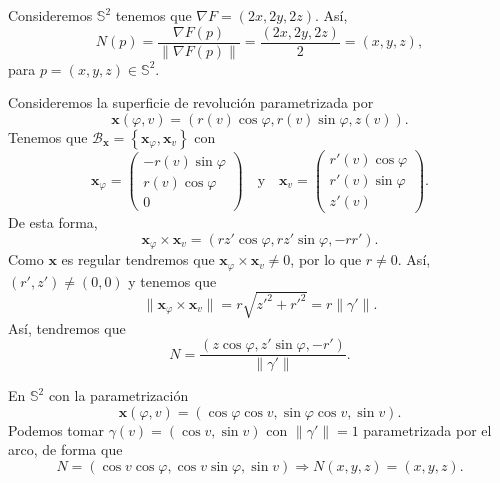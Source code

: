 \begin{eg}
Consideremos $\displaystyle \mathbb{S}^{2} $ tenemos que $\displaystyle \nabla F = \left(2x,2y,2z\right) $. Así, 
\[N\left(p\right)=\frac{\nabla F\left(p\right)}{\|\nabla F\left(p\right)\|}=\frac{\left(2x, 2y, 2z\right)}{2}=\left(x,y,z\right) ,\]
para $\displaystyle p = \left(x,y,z\right)\in \mathbb{S}^{2} $. 
\end{eg}
\begin{eg}
Consideremos la superficie de revolución parametrizada por 
\[ \textbf{x} \left(\varphi, v\right)=\left(r\left(v\right)\cos\varphi, r\left(v\right)\sin\varphi, z\left(v\right)\right) .\]
Tenemos que $\displaystyle \mathcal{B}_{ \textbf{x} } = \left\{ \textbf{x} _{\varphi}, \textbf{x} _{v}\right\}  $ con 
\[ \textbf{x} _{\varphi}=\begin{pmatrix} -r\left(v\right)\sin\varphi \\ r\left(v\right)\cos\varphi \\ 0 \end{pmatrix} \quad \text{y} \quad \textbf{x} _{v}=\begin{pmatrix} r'\left(v\right)\cos\varphi \\ r'\left(v\right)\sin\varphi \\ z'\left(v\right) \end{pmatrix} .\]
De esta forma,  
\[ \textbf{x} _{\varphi} \times \textbf{x} _{v}= \left(rz'\cos\varphi, rz'\sin\varphi, -rr'\right) .\]
Como $\displaystyle \textbf{x}  $ es regular tendremos que $\displaystyle \textbf{x} _{\varphi }\times \textbf{x} _{v}\neq 0 $, por lo que $\displaystyle r \neq 0 $. Así, $\displaystyle \left(r',z'\right)\neq \left(0,0\right) $ y tenemos que 
\[ \| \textbf{x} _{\varphi}\times \textbf{x} _{v}\| = r\sqrt{z'^{2} + r'^{2}}=r\|\gamma'\| .\]
Así, tendremos que 
\[N = \frac{\left(z\cos\varphi, z'\sin\varphi, -r'\right)}{\|\gamma'\|} .\]
\end{eg}
\begin{eg}
En $\displaystyle \mathbb{S}^{2} $ con la parametrización 
\[ \textbf{x} \left(\varphi, v\right)=\left(\cos \varphi \cos v, \sin \varphi \cos v, \sin v\right) .\]
Podemos tomar $\displaystyle \gamma\left(v\right)=\left(\cos v, \sin v\right) $ con $\displaystyle \|\gamma'\| = 1 $ parametrizada por el arco, de forma que 
\[N = \left(\cos v \cos \varphi, \cos v \sin \varphi, \sin v\right) \Rightarrow N\left(x,y,z\right)=\left(x,y,z\right) .\]
\end{eg}
